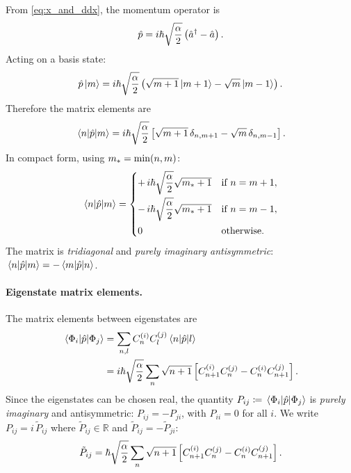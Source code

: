 From \cref{eq:x_and_ddx}, the momentum operator is
\begin{equation}
  \hat{p} = i\hbar\sqrt{\frac{\alpha}{2}}\left(\hat{a}^{\dagger} - \hat{a}\right).
\end{equation}
Acting on a basis state:
\begin{equation}
  \hat{p}\ket{m} = i\hbar\sqrt{\frac{\alpha}{2}}\left(\sqrt{m+1}\ket{m+1} - \sqrt{m}\ket{m-1}\right).
\end{equation}
Therefore the matrix elements are
\begin{equation}\label{eq:p_mel}
  \mel{n}{\hat{p}}{m}
  = i\hbar\sqrt{\frac{\alpha}{2}}\left[\sqrt{m+1}\,\delta_{n,m+1} - \sqrt{m}\,\delta_{n,m-1}\right].
\end{equation}
In compact form, using $m_* = \min(n,m)$:
\begin{equation}\label{eq:p_mel_compact}
  \mel{n}{\hat{p}}{m} =
  \begin{cases}
    +\,i\hbar\sqrt{\dfrac{\alpha}{2}}\sqrt{m_*+1} & \text{if } n = m+1,\\[8pt]
    -\,i\hbar\sqrt{\dfrac{\alpha}{2}}\sqrt{m_*+1} & \text{if } n = m-1,\\[8pt]
    0 & \text{otherwise.}
  \end{cases}
\end{equation}
The matrix is \emph{tridiagonal} and \emph{purely imaginary antisymmetric}: $\mel{n}{\hat{p}}{m} = -\mel{m}{\hat{p}}{n}$.

\paragraph{Eigenstate matrix elements.}

The matrix elements between eigenstates are
\begin{align}
  \mel{\Phi_i}{\hat{p}}{\Phi_j}
  &= \sum_{n,l} C_n^{(i)} C_l^{(j)} \mel{n}{\hat{p}}{l}\notag\\
  &= i\hbar\sqrt{\frac{\alpha}{2}} \sum_n \sqrt{n+1}\left[C_{n+1}^{(i)} C_n^{(j)} - C_n^{(i)} C_{n+1}^{(j)}\right].
  \label{eq:p_eigenstate}
\end{align}
Since the eigenstates can be chosen real, the quantity $P_{ij} \coloneqq \mel{\Phi_i}{\hat{p}}{\Phi_j}$ is \emph{purely imaginary} and antisymmetric: $P_{ij} = -P_{ji}$, with $P_{ii} = 0$ for all $i$.
We write $P_{ij} = i\,\tilde{P}_{ij}$ where $\tilde{P}_{ij} \in \mathbb{R}$ and $\tilde{P}_{ij} = -\tilde{P}_{ji}$:
\begin{equation}\label{eq:Ptilde}
  \tilde{P}_{ij} = \hbar\sqrt{\frac{\alpha}{2}} \sum_n \sqrt{n+1}\left[C_{n+1}^{(i)} C_n^{(j)} - C_n^{(i)} C_{n+1}^{(j)}\right].
\end{equation}

